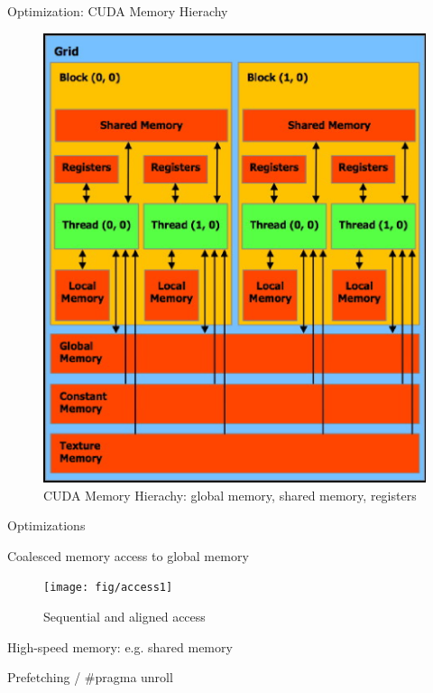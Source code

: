 \documentclass[
nopagebreaks,
style=klope,
fleqn]{powerdot}
\begin{document}
\begin{slide}{Optimization: CUDA Memory Hierachy}
  \begin{figure}[!h]
  \centering
  \includegraphics[height=0.6\textheight]{fig/cuda_memory}
  \caption{CUDA Memory Hierachy: global memory, shared memory, registers}
  \label{fig:cuda_memory}
  \end{figure}

\end{slide}

\begin{slide}{Optimizations}
  \begin{compactitem}
  \item{Coalesced memory access to global memory}
    \begin{figure}[!h]
    \centering
    \texttt{[image: fig/access1]}
    \caption{Sequential and aligned access}
    \label{fig:access1}
    \end{figure}
  \item{High-speed memory: e.g. shared memory}
  \item{Prefetching / \#pragma unroll}
  \end{compactitem}
\end{slide}
\end{document}
